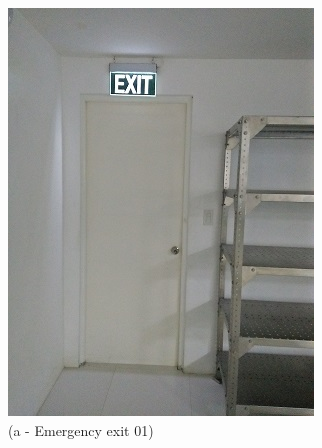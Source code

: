 \begin{figure}
	\begin{minipage}[b]{0.22\linewidth}
		\centering
				\includegraphics[width=\textwidth]{figures/R1P_safety/emergencyexitsignale01.jpg}
		\caption*{(a - Emergency exit 01)}
	\end{minipage}
	\hspace{0.05cm}
	\begin{minipage}[b]{0.22\linewidth}
		\centering

\end{minipage}
\end{figure}

